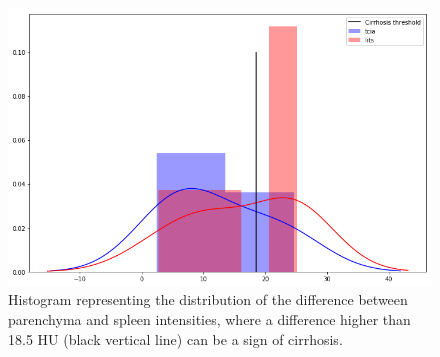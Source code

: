 \begin{figure}[!ht]
	\centering
	\includegraphics[width=0.6\linewidth]{../Contributions/images/LITS_TCIA_cirrhosisPlot}
	\caption{Histogram representing the distribution of the difference between parenchyma and spleen intensities, where a difference higher than 18.5 HU (black vertical line) can be a sign of cirrhosis.}
	\label{fig:cirrhosisPlot}
\end{figure}


